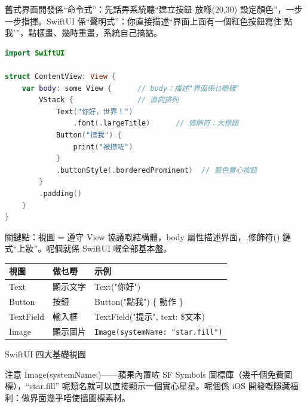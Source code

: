


舊式界面開發係“命令式”：先話畀系統聽“建立按鈕 放喺(20,30) 設定顏色”，一步一步指揮。SwiftUI 係“聲明式”：你直接描述“界面上面有一個紅色按鈕寫住'點我'”，點樣畫、幾時重畫，系統自己搞掂。

\begin{lstlisting}[language=Swift]
import SwiftUI

struct ContentView: View {
    var body: some View {      // body：描述"界面係乜嘢樣"
        VStack {               // 直向排列
            Text("你好，世界！")
                .font(.largeTitle)      // 修飾符：大標題
            Button("㩒我") {
                print("被㩒咗")
            }
            .buttonStyle(.borderedProminent)  // 藍色實心按鈕
        }
        .padding()
    }
}
\end{lstlisting}

關鍵點：視圖 = 遵守 View 協議嘅結構體，body 屬性描述界面，.修飾符() 鏈式“上妝”。呢個就係 SwiftUI 嘅全部基本盤。


\begin{center}
\begin{tabularx}{\linewidth}{|X|X|X|}
\hline
\textbf{視圖} & \textbf{做乜嘢} & \textbf{示例} \tabularnewline
\hline
Text & 顯示文字 & Text("你好") \tabularnewline
Button & 按鈕 & Button("點我") \{ 動作 \} \tabularnewline
TextField & 輸入框 & TextField("提示", text: \$文本) \tabularnewline
Image & 顯示圖片 & \texttt{Image(systemName: "star.\allowbreak fill")} \tabularnewline
\hline
\end{tabularx}
\end{center}

\begin{center}\small\color{gray}SwiftUI 四大基礎視圖\end{center}

注意 Image(systemName:)——蘋果內置咗 SF Symbols 圖標庫（幾千個免費圖標），“star.fill” 呢類名就可以直接顯示一個實心星星。呢個係 iOS 開發嘅隱藏福利：做界面幾乎唔使搵圖標素材。


